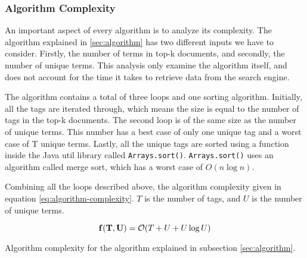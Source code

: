 \subsubsection{Algorithm Complexity}
An important aspect of every algorithm is to analyze its complexity.
The algorithm explained in \ref{sec:algorithm} has two different inputs we have to consider.
Firstly, the number of terms in top-k documents, and secondly, the number of unique terms.
This analysis only examine the algorithm itself, and does not account for the time it takes to retrieve data from the search engine.

The algorithm contains a total of three loops and one sorting algorithm.
Initially, all the tags are iterated through,
which means the size is equal to the number of tags in the top-k documents.
The second loop is of the same size as the number of unique terms.
This number has a best case of only one unique tag and a worst case of T unique terms.
Lastly, all the unique tags are sorted using a function inside the Java util library called \texttt{Arrays.sort()}.
\texttt{Arrays.sort()} uses an algorithm called merge sort,
which has a worst case of $O(n\log{}n)$.

Combining all the loops described above, the algorithm complexity  given in equation \ref{eq:algorithm-complexity}.
$T$ is the number of tags, and $U$ is the number of unique terms.

\begin{cequation}[H]
	\begin{equation}
		\mathbf{ f(T, U) } = \mathcal{O}( T + U + U\log{}U ) \\
	\end{equation}
  \caption{Algorithm complexity for the algorithm explained in subsection \ref{sec:algorithm}.}
  \label{eq:algorithm-complexity}
\end{cequation}





